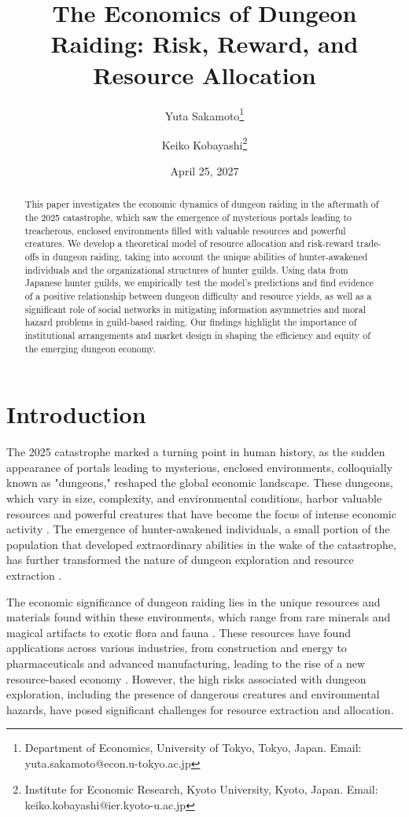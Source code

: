\documentclass[12pt, a4paper]{article}
\title{The Economics of Dungeon Raiding: Risk, Reward, and Resource Allocation}
\author{Yuta Sakamoto\thanks{Department of Economics, University of Tokyo, Tokyo, Japan. Email: yuta.sakamoto@econ.u-tokyo.ac.jp} \and Keiko Kobayashi\thanks{Institute for Economic Research, Kyoto University, Kyoto, Japan. Email: keiko.kobayashi@ier.kyoto-u.ac.jp}}
\date{April 25, 2027}
\begin{document}
\maketitle

\begin{abstract}
This paper investigates the economic dynamics of dungeon raiding in the aftermath of the 2025 catastrophe, which saw the emergence of mysterious portals leading to treacherous, enclosed environments filled with valuable resources and powerful creatures. We develop a theoretical model of resource allocation and risk-reward trade-offs in dungeon raiding, taking into account the unique abilities of hunter-awakened individuals and the organizational structures of hunter guilds. Using data from Japanese hunter guilds, we empirically test the model's predictions and find evidence of a positive relationship between dungeon difficulty and resource yields, as well as a significant role of social networks in mitigating information asymmetries and moral hazard problems in guild-based raiding. Our findings highlight the importance of institutional arrangements and market design in shaping the efficiency and equity of the emerging dungeon economy.
\end{abstract}

\section{Introduction}
The 2025 catastrophe marked a turning point in human history, as the sudden appearance of portals leading to mysterious, enclosed environments, colloquially known as "dungeons," reshaped the global economic landscape. These dungeons, which vary in size, complexity, and environmental conditions, harbor valuable resources and powerful creatures that have become the focus of intense economic activity \citep{nakamura2026rise}. The emergence of hunter-awakened individuals, a small portion of the population that developed extraordinary abilities in the wake of the catastrophe, has further transformed the nature of dungeon exploration and resource extraction \citep{lee2027psychological}.

The economic significance of dungeon raiding lies in the unique resources and materials found within these environments, which range from rare minerals and magical artifacts to exotic flora and fauna \citep{adesina2027harnessing}. These resources have found applications across various industries, from construction and energy to pharmaceuticals and advanced manufacturing, leading to the rise of a new resource-based economy \citep{sakamoto2026emergence}. However, the high risks associated with dungeon exploration, including the presence of dangerous creatures and environmental hazards, have posed significant challenges for resource extraction and allocation.
\end{document}
